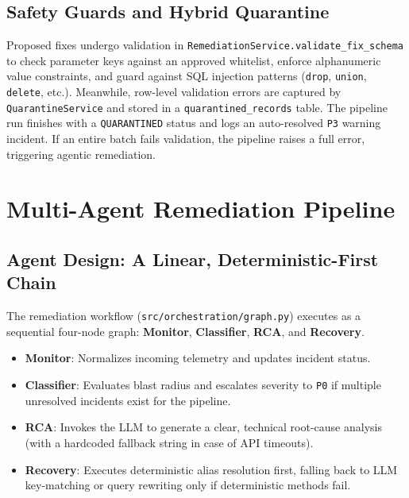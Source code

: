 \documentclass[11pt]{article}
\newcommand{\code}[1]{\texttt{\small #1}}
\begin{document}
\subsection{Safety Guards and Hybrid Quarantine}
Proposed fixes undergo validation in \code{RemediationService.validate\_fix\_schema} to check parameter keys against an approved whitelist, enforce alphanumeric value constraints, and guard against SQL injection patterns (\code{drop}, \code{union}, \code{delete}, etc.). Meanwhile, row-level validation errors are captured by \code{QuarantineService} and stored in a \code{quarantined\_records} table. The pipeline run finishes with a \code{QUARANTINED} status and logs an auto-resolved \code{P3} warning incident. If an entire batch fails validation, the pipeline raises a full error, triggering agentic remediation.

\section{Multi-Agent Remediation Pipeline}

\subsection{Agent Design: A Linear, Deterministic-First Chain}
The remediation workflow (\code{src/orchestration/graph.py}) executes as a sequential four-node graph: \textbf{Monitor}, \textbf{Classifier}, \textbf{RCA}, and \textbf{Recovery}. 
\begin{itemize}
  \item \textbf{Monitor}: Normalizes incoming telemetry and updates incident status.
  \item \textbf{Classifier}: Evaluates blast radius and escalates severity to \code{P0} if multiple unresolved incidents exist for the pipeline.
  \item \textbf{RCA}: Invokes the LLM to generate a clear, technical root-cause analysis (with a hardcoded fallback string in case of API timeouts).
  \item \textbf{Recovery}: Executes deterministic alias resolution first, falling back to LLM key-matching or query rewriting only if deterministic methods fail.
\end{itemize}
\end{document}
